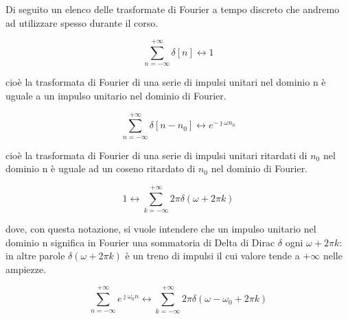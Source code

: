 Di seguito un elenco delle trasformate di Fourier a tempo discreto che andremo ad utilizzare spesso durante il corso. \newline 

{
    \Large 
    \begin{equation}
        \sum_{n = - \infty}^{+ \infty}
        \delta \left[n\right] 
        \leftrightarrow 
        1
    \end{equation}
}

cioè la trasformata di Fourier di una serie di impulsi unitari nel dominio n 
è uguale a un impulso unitario nel dominio di Fourier. \newline 


{
    \Large 
    \begin{equation}
        \sum_{n = - \infty}^{+ \infty}
        \delta \left[ n - n_0\right]
        \leftrightarrow 
        e^{-\jmath \omega n_0}
    \end{equation}
}

cioè la trasformata di Fourier di una serie di impulsi unitari ritardati di $n_0$ nel dominio n 
è uguale ad un coseno ritardato di $n_0$ nel dominio di Fourier. \newline 

{
    \Large 
    \begin{equation}
        1
        \leftrightarrow
        \sum_{k = -\infty}^{+ \infty}
        2 \pi 
        \delta \left( \omega + 2 \pi k\right)
    \end{equation}
}

dove, con questa notazione, si vuole intendere che un impulso unitario nel dominio n significa in Fourier 
una sommatoria di Delta di Dirac $\delta$ ogni $\omega + 2 \pi k$: in altre parole $\delta \left( \omega + 2 \pi k\right)$ è un treno di impulsi il cui valore tende a $+ \infty$ nelle ampiezze. \newline 

{
    \Large 
    \begin{equation}
        \sum_{n = - \infty}^{+ \infty}
        e^{\jmath \omega_0 n}
        \leftrightarrow 
        \sum_{k = -\infty}^{+ \infty}
        2 \pi 
        \delta \left( \omega - \omega_0 + 2 \pi k\right)
    \end{equation}
}

